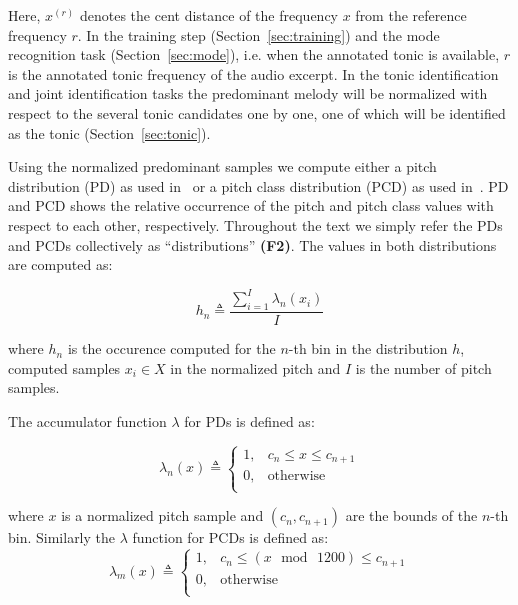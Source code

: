 \documentclass{sig-alternate}
\begin{document}
Here, $x^{(r)}$ denotes the cent distance of the frequency $x$ from the reference frequency $r$. In the training step (Section~\ref{sec:training}) and the mode recognition task (Section~\ref{sec:mode}), i.e. when the annotated tonic is available, $r$ is the annotated tonic frequency of the audio excerpt. In the tonic identification and joint identification tasks the predominant melody will be normalized with respect to the several tonic candidates one by one, one of which will be identified as the tonic (Section~\ref{sec:tonic}).

Using the normalized predominant samples we compute either a pitch distribution (PD) as used in~\cite{bozkurt_makam} or a pitch class distribution (PCD) as used in~\cite{chordia}. PD and PCD shows the relative occurrence of the pitch and pitch class values with respect to each other, respectively. Throughout the text we simply refer the PDs and PCDs collectively as ``distributions'' {\bf (F2)}. The values in both distributions are computed as:

\begin{equation}
	h_n  \triangleq \frac{\sum_{i=1}^I \lambda_n\left(x_i\right)}{I}
	\label{eqn:histogram}
\end{equation}

\noindent
where $h_{n}$ is the occurence computed for the $n$-th bin in the distribution $h$, computed samples $x_i \in X$ in the normalized pitch and $I$ is the number of pitch samples.

The accumulator function $\lambda$ for PDs is defined as:

\begin{equation}
\lambda_{n}(x) \triangleq
\begin{cases}
1, & c_{n} \leq x \leq  c_{n+1} \\
0, & \text{otherwise} \\
\end{cases}
\end{equation}

\noindent
where $x$ is a normalized pitch sample and $(c_{n}, c_{n+1})$ are the bounds of the $n$-th bin. 
Similarly the $\lambda$ function for PCDs is defined as:
\begin{equation}
\lambda_{m}(x)  \triangleq
\begin{cases}
1, & c_{n} \leq \left(x\,\bmod\,1200\right) \leq  c_{n+1} \\
0, & \text{otherwise} \\
\end{cases}
\end{equation}
\end{document}
